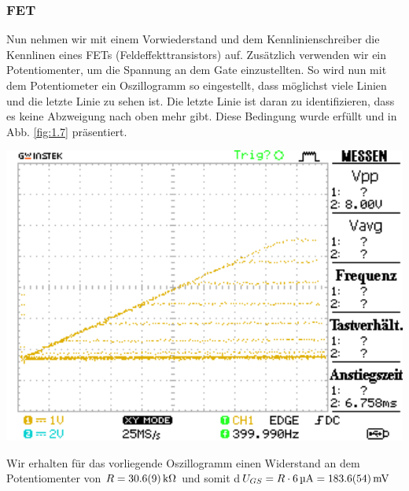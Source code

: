 \documentclass[10pt]{article}
\newenvironment{Figure}
  {\par\medskip\noindent\minipage{\linewidth}}
  {\endminipage\par\medskip}
\begin{document}
\begin{multicols}{2}
	\subsubsection*{FET}
	Nun nehmen wir mit einem Vorwiederstand und dem Kennlinienschreiber die Kennlinen eines FETs (Feldeffekttransistors) auf. Zusätzlich verwenden wir ein Potentiomenter, um die Spannung an dem Gate einzustellten. So wird nun mit dem Potentiometer ein Oszillogramm so eingestellt, dass möglichst viele Linien und die letzte Linie zu sehen ist. Die letzte Linie ist daran zu identifizieren, dass es keine Abzweigung nach oben mehr gibt. Diese Bedingung wurde erfüllt und in Abb. \ref{fig:1.7} präsentiert.
	\begin{Figure}
		\centering\includegraphics[width=1\textwidth]{../data/DS0000.png}
		\label{fig:1.7}
	\end{Figure}
	Wir erhalten für das vorliegende Oszillogramm einen Widerstand an dem Potentiomenter von $R=\SI{30.6+-0.9}{\kilo\Omega}$ und somit d$U_{GS}=R\cdot \SI{6}{\micro A}=\SI{183.6+-5.4}{\milli V}$


\end{multicols}
\end{document}
